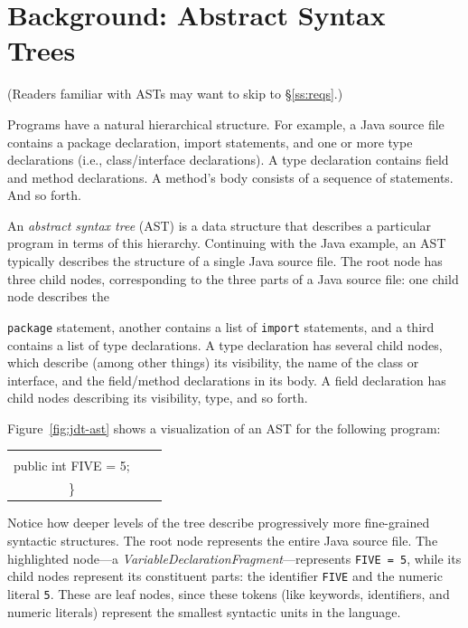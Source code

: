 \documentclass[prodmode]{acmlarge}
\newcommand{\ttt}[1]{\texttt{#1}}
\begin{document}
\section{Background: Abstract Syntax Trees}
\label{ss:asts}

(Readers familiar with ASTs may want to skip to \S\ref{ss:reqs}.)

Programs have a natural hierarchical structure.  For example, a Java source
file contains a package declaration, import statements, and one or more type
declarations (i.e., class/interface declarations).  A type declaration contains
field and method declarations.  A method's body consists of a sequence of
statements.  And so forth.

An \textit{abstract syntax tree} (AST) is a data structure that describes a
particular program in terms of this hierarchy.  Continuing with the Java
example, an AST typically describes the structure of a single Java source file.
The root node has three child nodes, corresponding to the three parts of a Java
source file: one child node describes the 


\noindent
\ttt{package} statement, another
contains a list of \ttt{import} statements, and a third contains a list of type
declarations.  A type declaration has several child nodes, which describe
(among other things) its visibility, the name of the class or interface, and
the field/method declarations in its body.  A field declaration has child nodes
describing its visibility, type, and so forth.

Figure~\ref{fig:jdt-ast} shows a visualization of an AST for the following
program:

\begin{center}
\vspace*{1em}
\begin{tabular}{ccc}
\begin{minipage}{2.25in}
\noindent \ttt{public class Example \{ \\
\hspace*{1.5em} public int FIVE = 5; \\
\}
}
\end{minipage}
\end{tabular}
\vspace*{1em}
\end{center}

Notice how deeper levels of the tree describe progressively more fine-grained
syntactic structures.  The root node represents the entire Java source file.
The highlighted node---a \textit{VariableDeclarationFragment}---represents
\ttt{FIVE = 5}, while its child nodes represent its constituent parts: the
identifier \ttt{FIVE} and the numeric literal \ttt{5}.  These are leaf nodes,
since these tokens (like keywords, identifiers, and numeric literals) represent
the smallest syntactic units in the language.
\end{document}
